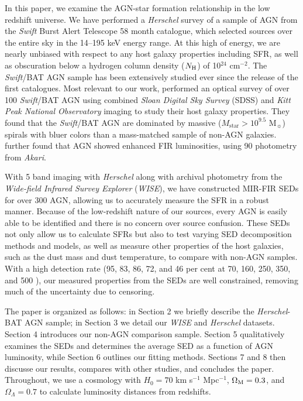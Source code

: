 \documentclass[fleqn, usenatbib]{mnras}
\newcommand{\herschel}{\emph{Herschel}}
\newcommand{\swift}{\textit{Swift}}
\newcommand{\msun}{M$_{\sun}$}
\newcommand{\mstar}{$M_{\mathrm{star}}$}
\begin{document}
In this paper, we examine the AGN-star formation relationship in the low redshift universe. We have performed a \herschel{} survey of a sample of AGN from the \textit{Swift} Burst Alert Telescope 58 month catalogue, which selected sources over the entire sky in the 14--195 keV energy range. At this high of energy, we are nearly unbiased with respect to any host galaxy properties including SFR, as well as obscuration below a hydrogen column density ($N_{\rm H}$) of 10$^{24}$ cm$^{-2}$. The \swift/BAT AGN sample has been extensively studied ever since the release of the first catalogues. Most relevant to our work, \citet{Koss:2011vn} performed an optical survey of over 100 \swift/BAT AGN using combined \textit{Sloan Digital Sky Survey} (SDSS) and \textit{Kitt Peak National Observatory} imaging to study their host galaxy properties. They found that the \swift/BAT AGN are dominated by massive (\mstar $> 10^{9.5}$ \msun) spirals with bluer colors than a mass-matched sample of non-AGN galaxies. \citet{Koss:2011vn} further found that AGN showed enhanced FIR luminosities, using 90 \micron{} photometry from \textit{Akari}. 

With 5 band imaging with \herschel{} along with archival photometry from the \textit{Wide-field Infrared Survey Explorer} (\textit{WISE}), we have constructed MIR-FIR SEDs for over 300 AGN, allowing us to accurately measure the SFR in a robust manner. Because of the low-redshift nature of our sources, every AGN is easily able to be identified and there is no concern over source confusion. These SEDs not only allow us to calculate SFRs but also to test varying SED decomposition methods and models, as well as measure other properties of the host galaxies, such as the dust mass and dust temperature, to compare with non-AGN samples. With a high detection rate (95, 83, 86, 72, and 46 per cent at 70, 160, 250, 350, and 500 \micron), our measured properties from the SEDs are well constrained, removing much of the uncertainty due to censoring. 

The paper is organized as follows: in Section 2 we briefly describe the \herschel-BAT AGN sample; in Section 3 we detail our \textit{WISE} and \herschel{} datasets. Section 4 introduces our non-AGN comparison sample. Section 5 qualitatively examines the SEDs and determines the average SED as a function of AGN luminosity, while Section 6 outlines our fitting methods. Sections 7 and 8 then discusse our results, compares with other studies, and concludes the paper. Throughout, we use a cosmology with $H_{0}=70$ km s$^{-1}$ Mpc$^{-1}$, $\Omega_{\rm M}=0.3$, and $\Omega_{\Lambda} = 0.7$ to calculate luminosity distances from redshifts. 
\end{document}
